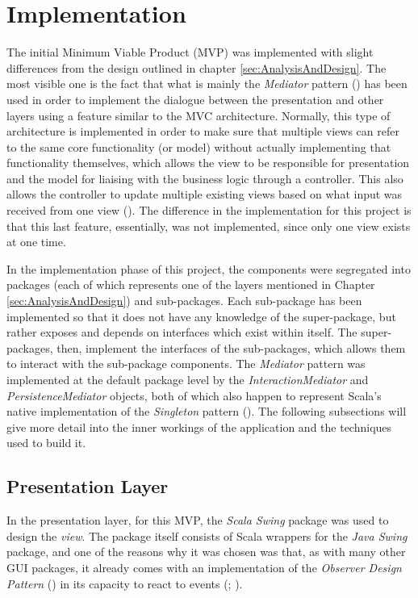 \section{Implementation} \label{sec:Implementation}

The initial Minimum Viable Product (MVP) was implemented with slight
differences from the design outlined in chapter \ref{sec:AnalysisAndDesign}.
The most visible one is the fact that what is mainly the \emph{Mediator}
pattern (\cite[][Ch.~9,~Location~3594]{nikolov2016scala}) has been used in
order to implement the dialogue between the presentation and other layers using
a feature similar to the MVC architecture. Normally, this type of architecture
is implemented in order to make sure that multiple views can refer to the same
core functionality (or model) without actually implementing that functionality
themselves, which allows the view to be responsible for presentation and the
model for liaising with the business logic through a controller. This also
allows the controller to update multiple existing views based on what input was
received from one view (\cite[][p.~381]{bennett2010object}). The difference in
the implementation for this project is that this last feature, essentially, was
not implemented, since only one view exists at one time.

In the implementation phase of this project, the components were segregated
into packages (each of which represents one of the layers mentioned in Chapter
\ref{sec:AnalysisAndDesign}) and sub-packages. Each sub-package has been
implemented so that it does not have any knowledge of the super-package, but
rather exposes and depends on interfaces which exist within itself. The
super-packages, then, implement the interfaces of the sub-packages, which
allows them to interact with the sub-package components. The \emph{Mediator}
pattern was implemented at the default package level by the
\emph{InteractionMediator} and \emph{PersistenceMediator} objects, both of
which also happen to represent Scala's native implementation of the
\emph{Singleton} pattern (\cite[][Ch.~6,~Location.~2242]{nikolov2016scala}).
The following subsections will give more detail into the inner workings of the
application and the techniques used to build it.

\subsection{Presentation Layer} \label{sec:Implementation.Presentation}
In the presentation layer, for this MVP, the \emph{Scala Swing} package was
used to design the \emph{view}. The package itself consists of Scala wrappers
for the \emph{Java Swing} package, and one of the reasons why it was chosen was
that, as with many other GUI packages, it already comes with an implementation
of the \emph{Observer Design Pattern} (\cite[][p.~293]{gamma1995design}) in its
capacity to react to events (\cite[][p.~5]{maier2009scala};
\cite[][Ch.~9,~Location~3731]{nikolov2016scala}).

